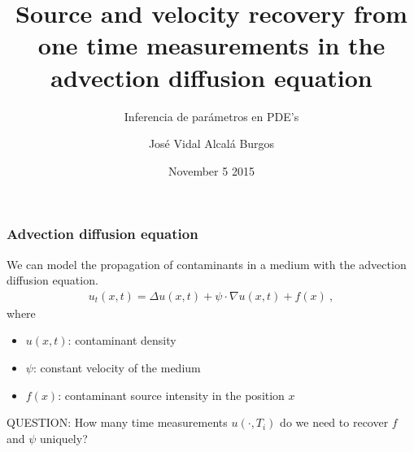 \documentclass{beamer}
\title[Source and velocity recovery from one time measurements in the advection diffusion equation]{Source and velocity recovery from one time measurements in the advection diffusion equation}
\subtitle{Inferencia de parámetros en PDE's}
\author{José Vidal Alcalá Burgos}
\institute{Catedrático CONACYT - CIMAT}
\date{November 5 2015}
\begin{document}
\begin{frame}
\titlepage
\end{frame}


\begin{frame} 
\frametitle{Advection diffusion equation}
We can model the propagation of contaminants in a medium with the advection diffusion equation.
\begin{equation*}
  \begin{split}
    u_t(x, t) = \Delta u(x, t) + \psi \cdot \nabla u(x,t) + f(x)\:,
  \end{split}
\end{equation*}
where
\begin{itemize}
  \item $u(x,t)$: contaminant density
  \item $\psi$: \alert{constant} velocity of the medium
  \item $f(x)$: contaminant \alert{source} intensity in the position $x$
\end{itemize}

\alert{QUESTION:} How many time measurements $u(\cdot, T_i)$ do we need to recover $f$ and $\psi$ uniquely?
\end{frame}
\end{document}
